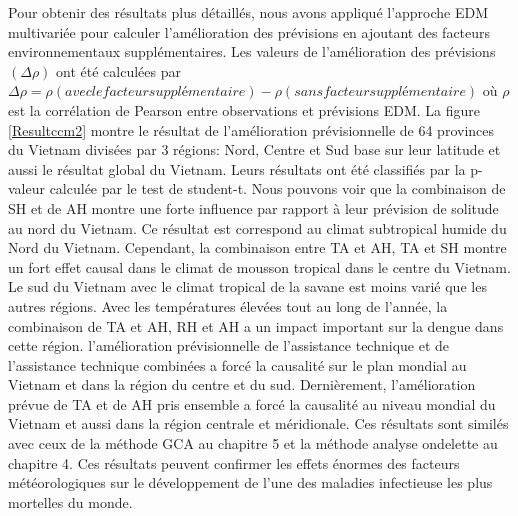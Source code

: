 Pour obtenir des résultats plus détaillés, nous avons appliqué l'approche EDM multivariée pour calculer l'amélioration des prévisions en ajoutant des facteurs environnementaux supplémentaires.  Les valeurs de l'amélioration des prévisions $(\Delta\rho)$ ont été calculées par $ \Delta \rho = \rho(avec le facteur supplémentaire) - \rho(sans facteur supplémentaire)$ où $\rho$ est la corrélation de Pearson entre observations et prévisions EDM. La figure \ref{Resultccm2} montre le résultat de l’amélioration prévisionnelle de 64 provinces du Vietnam divisées par 3 régions: Nord, Centre et Sud base sur leur latitude et aussi le résultat global du Vietnam. Leurs résultats ont été classifiés par la p-valeur calculée par le test de student-t. Nous pouvons voir que la combinaison de SH et de AH montre une forte influence par rapport à leur prévision de solitude au nord du Vietnam. Ce résultat est correspond au climat subtropical humide du Nord du Vietnam. Cependant, la combinaison entre TA et AH, TA et SH montre un fort effet causal dans le climat de mousson tropical dans le centre du Vietnam. Le sud du Vietnam avec le climat tropical de la savane est moins varié que les autres régions. Avec les températures élevées tout au long de l’année, la combinaison de TA et AH, RH et AH a un impact important sur la dengue dans cette région. l’amélioration prévisionnelle de l’assistance technique et de l’assistance technique combinées a forcé la causalité sur le plan mondial au Vietnam et dans la région du centre et du sud. Dernièrement, l’amélioration prévue de TA et de AH pris ensemble a forcé la causalité au niveau mondial du Vietnam et aussi dans la région centrale et méridionale.
Ces résultats sont similés avec ceux de la méthode GCA au chapitre 5 et la méthode analyse ondelette au chapitre 4.  Ces résultats peuvent confirmer les effets énormes des facteurs météorologiques sur le développement de l'une des maladies infectieuse les plus mortelles du monde. 

